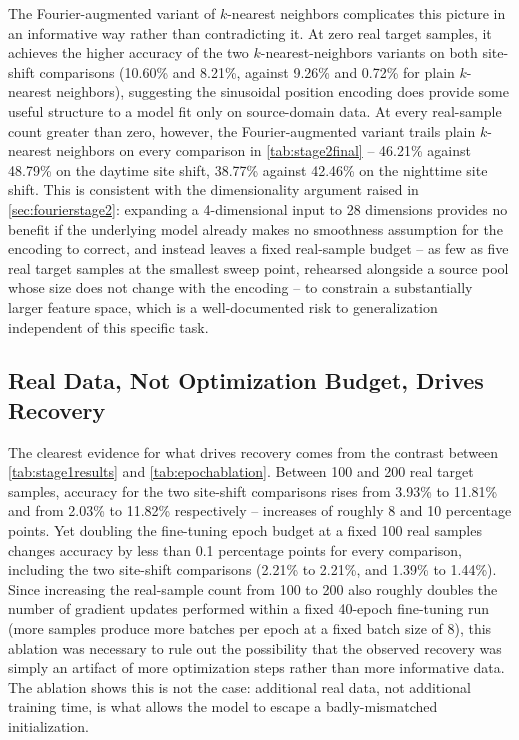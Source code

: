 \documentclass{iutbscthesis}
\begin{document}
The Fourier-augmented variant of $k$-nearest neighbors complicates this picture in an informative way rather than contradicting it. At zero real target samples, it achieves the higher accuracy of the two $k$-nearest-neighbors variants on both site-shift comparisons (10.60\% and 8.21\%, against 9.26\% and 0.72\% for plain $k$-nearest neighbors), suggesting the sinusoidal position encoding does provide some useful structure to a model fit only on source-domain data. At every real-sample count greater than zero, however, the Fourier-augmented variant trails plain $k$-nearest neighbors on every comparison in \autoref{tab:stage2final} -- 46.21\% against 48.79\% on the daytime site shift, 38.77\% against 42.46\% on the nighttime site shift. This is consistent with the dimensionality argument raised in \autoref{sec:fourierstage2}: expanding a 4-dimensional input to 28 dimensions provides no benefit if the underlying model already makes no smoothness assumption for the encoding to correct, and instead leaves a fixed real-sample budget -- as few as five real target samples at the smallest sweep point, rehearsed alongside a source pool whose size does not change with the encoding -- to constrain a substantially larger feature space, which is a well-documented risk to generalization independent of this specific task.

\subsection{Real Data, Not Optimization Budget, Drives Recovery}

The clearest evidence for what drives recovery comes from the contrast between \autoref{tab:stage1results} and \autoref{tab:epochablation}. Between 100 and 200 real target samples, accuracy for the two site-shift comparisons rises from 3.93\% to 11.81\% and from 2.03\% to 11.82\% respectively -- increases of roughly 8 and 10 percentage points. Yet doubling the fine-tuning epoch budget at a fixed 100 real samples changes accuracy by less than 0.1 percentage points for every comparison, including the two site-shift comparisons (2.21\% to 2.21\%, and 1.39\% to 1.44\%). Since increasing the real-sample count from 100 to 200 also roughly doubles the number of gradient updates performed within a fixed 40-epoch fine-tuning run (more samples produce more batches per epoch at a fixed batch size of 8), this ablation was necessary to rule out the possibility that the observed recovery was simply an artifact of more optimization steps rather than more informative data. The ablation shows this is not the case: additional real data, not additional training time, is what allows the model to escape a badly-mismatched initialization.
\end{document}
